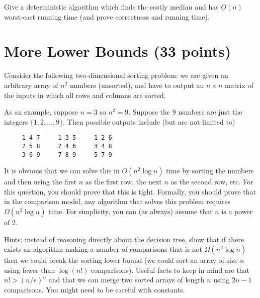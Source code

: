\documentclass[11pt]{article}
\begin{document}
Give a deterministic algorithm which finds the costly median and has $O(n)$ worst-cast running time (and prove correctness and running time).

\section{More Lower Bounds (33 points)}
Consider the following two-dimensional sorting problem: we are given an arbitrary array of $n^2$ numbers (unsorted), and have to output an $n \times n$ matrix of the inputs in which all rows and columns are sorted.  

As an example, suppose $n=3$ so $n^2 = 9$.  Suppose the $9$ numbers are just the integers $\{1,2,\dots, 9\}$.  Then possible outputs include (but are not limited to)
\begin{verbatim}
     1 4 7     1 3 5     1 2 6
     2 5 8     2 4 6     3 4 8
     3 6 9     7 8 9     5 7 9
\end{verbatim}

It is obvious that we can solve this in $O(n^2 \log n)$ time by sorting the numbers and then using the first $n$ as the first row, the next $n$ as the second row, etc.  For this question, you should prove that this is tight.  Formally, you should prove that in the comparison model, any algorithm that solves this problem requires $\Omega(n^2 \log n)$ time.  For simplicity, you can (as always) assume that $n$ is a power of $2$.

Hints: instead of reasoning directly about the decision tree, show that if there exists an algorithm making a number of comparisons that is not $\Omega(n^2 \log n)$ then we could break the sorting lower bound (we could sort an array of size $n$ using fewer than $\log(n!)$ comparisons).  Useful facts to keep in mind are that $n! > (n / e)^n$ and that we can merge two sorted arrays of length $n$ using $2n-1$ comparisons.  You might need to be careful with constants.
\end{document}
